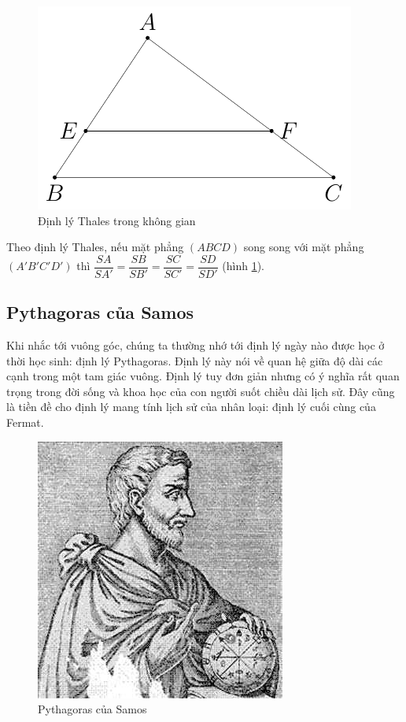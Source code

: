 \begin{figure}[ht]
	\centering
	\includegraphics[page=2]{analytic_geometry/thales_theorem.pdf}
	\caption{Định lý Thales trong không gian}
	\label{thales2}
\end{figure}

Theo định lý Thales, nếu mặt phẳng $(ABCD)$ song song với mặt phẳng $(A'B'C'D')$ thì $\dfrac{SA}{SA'} = \dfrac{SB}{SB'} = \dfrac{SC}{SC'} = \dfrac{SD}{SD'}$ (hình \ref{thales2}).

\subsection*{Pythagoras của Samos}

Khi nhắc tới vuông góc, chúng ta thường nhớ tới định lý ngày nào được học ở thời học sinh: định lý Pythagoras. Định lý này nói về quan hệ giữa độ dài các cạnh trong một tam giác vuông. Định lý tuy đơn giản nhưng có ý nghĩa rất quan trọng trong đời sống và khoa học của con người suốt chiều dài lịch sử. Đây cũng là tiền đề cho định lý mang tính lịch sử của nhân loại: định lý cuối cùng của Fermat.

\begin{figure}[ht]
	\centering
	\includegraphics[scale=0.5]{analytic_geometry/Pythagoras.jpeg}
	\captionsetup{labelformat=empty}
	\caption{Pythagoras của Samos}
\end{figure}

